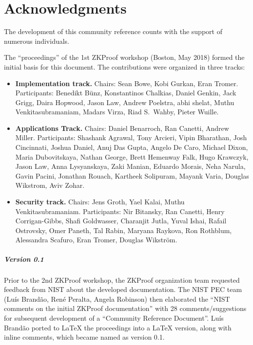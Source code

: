 \chapter*{Acknowledgments}
\label{app:acknowledgments}

The development of this community reference counts with the support of numerous individuals.


The ``proceedings'' of the 1st ZKProof workshop (Boston, May 2018) formed the initial basis for this document.
The contributions were organized in three tracks:

\begin{itemize}\setlength{\itemsep}{1ex}
	
\item \textbf{Implementation track.} 
	Chairs: Sean Bowe, Kobi Gurkan, Eran Tromer.
	Participants: Benedikt Bünz, Konstantinos Chalkias, Daniel Genkin, Jack Grigg, Daira Hopwood, Jason Law, Andrew Poelstra, abhi shelat, Muthu Venkita\-subramaniam, Madars Virza, Riad S.\ Wahby, Pieter Wuille.
	
\item \textbf{Applications Track.}
	Chairs: Daniel Benarroch, Ran Canetti, Andrew Miller.
	Participants: Shashank Agrawal, Tony Arcieri, Vipin Bharathan, Josh Cincinnati, Joshua Daniel,  Anuj Das Gupta, Angelo De Caro, Michael Dixon, Maria Dubovitskaya, Nathan George, Brett Hemenway Falk, Hugo Krawczyk, Jason Law, Anna Lysyanskaya, Zaki Manian, Eduardo Morais, Neha Narula, Gavin Pacini, Jonathan Rouach, Kartheek Solipuram, Mayank Varia, Douglas Wikstrom, Aviv Zohar.

\item \textbf{Security track.}
	Chairs: Jens Groth, Yael Kalai, Muthu Venkitasubramaniam.
	Participants: Nir Bitansky, Ran Canetti, Henry Corrigan-Gibbs, Shafi Goldwasser, Charanjit Jutla, Yuval Ishai, Rafail Ostrovsky, Omer Paneth, Tal Rabin, Maryana Raykova, Ron Rothblum, Alessandra Scafuro, Eran Tromer, Douglas Wikström.

\end{itemize}


\paragraph{Version 0.1}
Prior to the 2nd ZKProof workshop, the ZKProof organization team requested feedback from NIST about the developed documentation.
The NIST PEC team (Luís Brandão, René Peralta, Angela Robinson) then elaborated the ``NIST comments on the initial ZKProof documentation'' \cite{2019:PEC:zkproof-comments} with 28 comments/suggestions for subsequent development of a ``Community Reference Document''.
Luís Brandão ported to LaTeX the proceedings into a LaTeX version, along with inline comments, which became named as version 0.1.


